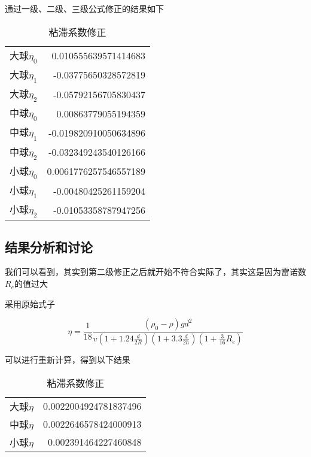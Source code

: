 \documentclass{article}
\begin{document}
通过一级、二级、三级公式修正的结果如下

\begin{table}[!hbtp]
    \begin{center}
    \caption{粘滞系数修正}
    \begin{tabular}{l|r}
        \hline
        大球$\eta _0$ & 0.010555639571414683 \\
        大球$\eta _1$ & -0.03775650328572819 \\
        大球$\eta _2$ & -0.05792156705830437 \\
        中球$\eta _0$ & 0.00863779055194359 \\
        中球$\eta _1$ & -0.019820910050634896 \\
        中球$\eta _2$ & -0.032349243540126166 \\
        小球$\eta _0$ & 0.0061776257546557189 \\
        小球$\eta _1$ & -0.00480425261159204 \\
        小球$\eta _2$ & -0.01053358787947256 \\

    \end{tabular}
    \end{center}
\end{table}




\subsection{结果分析和讨论}

我们可以看到，其实到第二级修正之后就开始不符合实际了，其实这是因为雷诺数$R_e$的值过大

采用原始式子

$$
\eta =\frac{1}{18}\frac{(\rho _0-\rho )gd^2}{v(1+1.24\frac{d}{2R})(1+3.3\frac{d}{2h})(1+\frac{3}{16}R_e)}
$$

可以进行重新计算，得到以下结果


\begin{table}[!hbtp]
    \begin{center}
    \caption{粘滞系数修正}
    \begin{tabular}{l|r}
        \hline
        大球$\eta $ & 0.0022004924781837496 \\
        中球$\eta $ & 0.0022646578424000913 \\
        小球$\eta $ & 0.002391464227460848 \\
    \end{tabular}
    \end{center}
\end{table}
\end{document}
